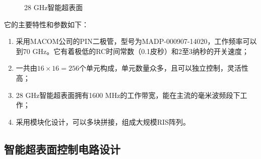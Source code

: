 \documentclass[supercite]{HustGraduPaper}
\begin{document}
\begin{figure}[htb]
	\centering
	\hfil
	\hfil
	\caption{28 GHz智能超表面}
	\label{fig:28-GHz-RIS}
\end{figure}

它的主要特性和参数如下：
\begin{enumerate}
	\item 采用MACOM公司的PIN二极管，型号为MADP-000907-14020，工作频率可以到70 GHz。它有着极低的RC时间常数（0.1皮秒）和2至3纳秒的开关速度；
	\item 一共由$16\times16=256$个单元构成，单元数量众多，且可以独立控制，灵活性高；
	\item 28 GHz智能超表面拥有1600 MHz的工作带宽，能在主流的毫米波频段下工作；
	\item 采用模块化设计，可以多块拼接，组成大规模RIS阵列。
\end{enumerate}

\subsection{智能超表面控制电路设计}
\end{document}
